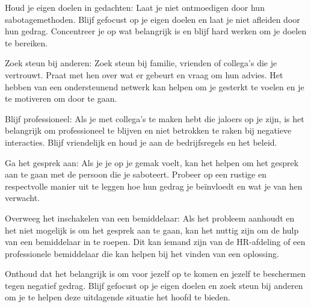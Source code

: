 Houd je eigen doelen in gedachten: Laat je niet ontmoedigen door hun sabotagemethoden. Blijf gefocust op je eigen doelen en laat je niet afleiden door hun gedrag. Concentreer je op wat belangrijk is en blijf hard werken om je doelen te bereiken.

Zoek steun bij anderen: Zoek steun bij familie, vrienden of collega's die je vertrouwt. Praat met hen over wat er gebeurt en vraag om hun advies. Het hebben van een ondersteunend netwerk kan helpen om je gesterkt te voelen en je te motiveren om door te gaan.

Blijf professioneel: Als je met collega's te maken hebt die jaloers op je zijn, is het belangrijk om professioneel te blijven en niet betrokken te raken bij negatieve interacties. Blijf vriendelijk en houd je aan de bedrijfsregels en het beleid.

Ga het gesprek aan: Als je je op je gemak voelt, kan het helpen om het gesprek aan te gaan met de persoon die je saboteert. Probeer op een rustige en respectvolle manier uit te leggen hoe hun gedrag je beïnvloedt en wat je van hen verwacht.

Overweeg het inschakelen van een bemiddelaar: Als het probleem aanhoudt en het niet mogelijk is om het gesprek aan te gaan, kan het nuttig zijn om de hulp van een bemiddelaar in te roepen. Dit kan iemand zijn van de HR-afdeling of een professionele bemiddelaar die kan helpen bij het vinden van een oplossing.

Onthoud dat het belangrijk is om voor jezelf op te komen en jezelf te beschermen tegen negatief gedrag. Blijf gefocust op je eigen doelen en zoek steun bij anderen om je te helpen deze uitdagende situatie het hoofd te bieden.
